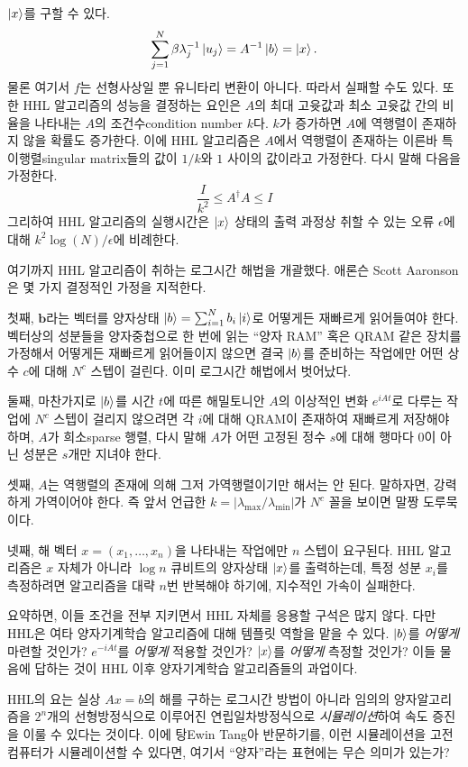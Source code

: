 \documentclass[a4paper,atbegshi,chapter]{oblivoir}
\begin{document}
$\ket{x}$를 구할 수 있다.
\[
  \sum_{j=1}^N\beta\lambda_j^{-1}\ket{u_j}=A^{-1}\ket{b}=\ket{x}.
\]
물론 여기서 $f$는 선형사상일 뿐 유니타리 변환이 아니다. 따라서 실패할 수도 있다.
또한 HHL 알고리즘의 성능을 결정하는 요인은 $A$의 최대 고윳값과 최소 고윳값 간의
비율을 나타내는 $A$의 조건수{\footnotesize condition number} $k$다. $k$가 증가하면
$A$에 역행렬이 존재하지 않을 확률도 증가한다. 이에 HHL 알고리즘은
$A$에서 역행렬이 존재하는 이른바 특이행렬{\footnotesize singular matrix}들의 값이
$1/k$와 $1$ 사이의 값이라고 가정한다. 다시 말해 다음을 가정한다.
\[
  \frac{I}{k^2}\leq A^{\dagger}A \leq I
\]
그리하여 HHL 알고리즘의 실행시간은 $\ket{x}$ 상태의 출력 과정상 취할 수 있는
오류 $\epsilon$에 대해 $k^2\log(N)/\epsilon$에 비례한다.

여기까지 HHL 알고리즘이 취하는 로그시간 해법을 개괄했다. 애론슨{\footnotesize
Scott Aaronson}은 몇 가지 결정적인 가정을 지적한다.

첫째, $\mathbf{b}$라는 벡터를 양자상태 $\ket{b}=\sum_{i=1}^Nb_i\ket{i}$로 어떻게든
재빠르게 읽어들여야 한다. 벡터상의 성분들을 양자중첩으로 한 번에 읽는
``양자 RAM'' 혹은 QRAM 같은 장치를 가정해서 어떻게든 재빠르게 읽어들이지
않으면 결국 $\ket{b}$를 준비하는 작업에만 어떤 상수 $c$에 대해 $N^c$ 스텝이
걸린다. 이미 로그시간 해법에서 벗어났다. 

둘째, 마찬가지로 $\ket{b}$를 시간 $t$에 따른 해밀토니안 $A$의 이상적인 변화
$e^{iAt}$로 다루는 작업에 $N^c$ 스텝이 걸리지 않으려면  각 $i$에 대해 QRAM이
존재하여 재빠르게 저장해야 하며, $A$가 희소{\footnotesize sparse} 행렬, 다시
말해 $A$가 어떤 고정된 정수 $s$에 대해 행마다 $0$이 아닌 성분은 $s$개만 지녀야
한다.

셋째, $A$는 역행렬의 존재에 의해 그저 가역행렬이기만 해서는 안 된다. 말하자면,
강력하게 가역이어야 한다. 즉 앞서 언급한 $k=|\lambda_{\max}/\lambda_{\min}|$가
$N^c$ 꼴을 보이면 말짱 도루묵이다.

넷째, 해 벡터 $x=(x_1,\ldots,x_n)$을 나타내는 작업에만 $n$ 스텝이 요구된다.
HHL 알고리즘은 $x$ 자체가 아니라 $\log n$ 큐비트의 양자상태 $\ket{x}$를
출력하는데, 특정 성분 $x_i$를 측정하려면 알고리즘을 대략 $n$번 반복해야
하기에, 지수적인 가속이 실패한다.

요약하면, 이들 조건을 전부 지키면서 HHL 자체를 응용할 구석은 많지 않다. 다만
HHL은 여타 양자기계학습 알고리즘에 대해 템플릿 역할을 맡을 수 있다. $\ket{b}$를
\emph{어떻게} 마련할 것인가? $e^{-iAt}$를 \emph{어떻게} 적용할 것인가? 
$\ket{x}$를 \emph{어떻게} 측정할 것인가? 이들 물음에 답하는 것이 HHL 이후
양자기계학습 알고리즘들의 과업이다. 

HHL의 요는 실상 $Ax=b$의 해를 구하는 로그시간 방법이 아니라 임의의 양자알고리즘을
$2^n$개의 선형방정식으로 이루어진 연립일차방정식으로 \emph{시뮬레이션}하여  
속도 증진을 이룰 수 있다는 것이다. 이에 탕{\footnotesize Ewin Tang}아 반문하기를,
이런 시뮬레이션을 고전 컴퓨터가 시뮬레이션할 수 있다면, 여기서 ``양자''라는 
표현에는 무슨 의미가 있는가?
\end{document}

